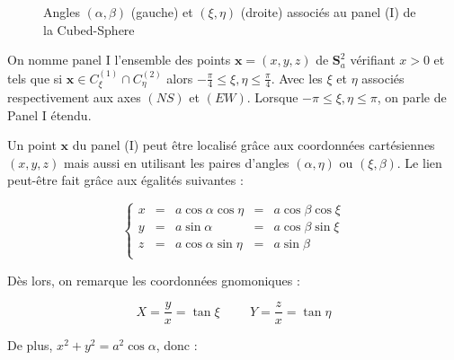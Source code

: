 \begin{figure}
\begin{center}
\caption{Angles $(\alpha, \beta)$ (gauche) et $(\xi,\eta)$ (droite) associés au panel (I) de la Cubed-Sphere}
\label{fig:coord cs}
\end{center}
\end{figure}


\begin{definition}
On nomme panel I l'ensemble des points $\mathbf{x}=(x,y,z)$ de $\mathbf{S}_a^2$ vérifiant $x>0$ et tels que si $\mathbf{x} \in C_{\xi}^{(1)} \cap C_{\eta}^{(2)}$ alors $-\frac{\pi}{4}\leq \xi,\eta \leq \frac{\pi}{4}$. Avec les $\xi$ et $\eta$ associés respectivement aux axes $(NS)$ et $(EW)$. Lorsque $-\pi \leq \xi,\eta \leq \pi$, on parle de Panel I étendu.
\end{definition}

Un point $\mathbf{x}$ du panel (I) peut être localisé grâce aux coordonnées cartésiennes $(x,y,z)$ mais aussi en utilisant les paires d'angles $(\alpha, \eta)$ ou $(\xi, \beta)$. Le lien peut-être fait grâce aux égalités suivantes :

\begin{equation}
\left\lbrace
\begin{array}{rcccc}
x & = & a \cos \alpha \cos \eta & = & a \cos \beta \cos \xi \\
y & = & a \sin \alpha & = & a \cos \beta \sin \xi \\
z & = & a \cos \alpha \sin \eta & = & a \sin \beta \\
\end{array}
\right.
\end{equation}

Dès lors, on remarque les coordonnées gnomoniques :

\begin{equation}
X=\dfrac{y}{x}=\tan \xi \hspace{1cm} Y = \dfrac{z}{x} = \tan \eta
\end{equation}

De plus, $x^2+y^2=a^2 \cos \alpha$, donc :

